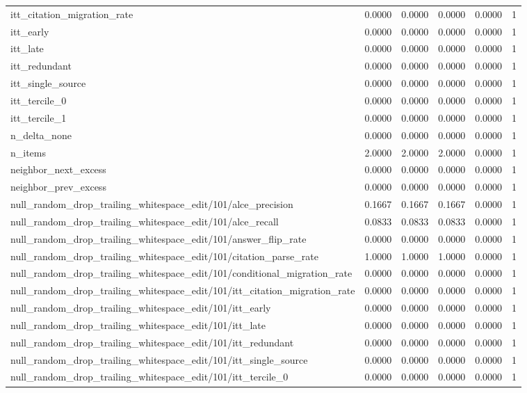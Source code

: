 \begin{table}[h]
\begin{tabular}{lrrrrr}
itt_citation_migration_rate & 0.0000 & 0.0000 & 0.0000 & 0.0000 & 1 \\
itt_early & 0.0000 & 0.0000 & 0.0000 & 0.0000 & 1 \\
itt_late & 0.0000 & 0.0000 & 0.0000 & 0.0000 & 1 \\
itt_redundant & 0.0000 & 0.0000 & 0.0000 & 0.0000 & 1 \\
itt_single_source & 0.0000 & 0.0000 & 0.0000 & 0.0000 & 1 \\
itt_tercile_0 & 0.0000 & 0.0000 & 0.0000 & 0.0000 & 1 \\
itt_tercile_1 & 0.0000 & 0.0000 & 0.0000 & 0.0000 & 1 \\
n_delta_none & 0.0000 & 0.0000 & 0.0000 & 0.0000 & 1 \\
n_items & 2.0000 & 2.0000 & 2.0000 & 0.0000 & 1 \\
neighbor_next_excess & 0.0000 & 0.0000 & 0.0000 & 0.0000 & 1 \\
neighbor_prev_excess & 0.0000 & 0.0000 & 0.0000 & 0.0000 & 1 \\
null_random_drop_trailing_whitespace_edit/101/alce_precision & 0.1667 & 0.1667 & 0.1667 & 0.0000 & 1 \\
null_random_drop_trailing_whitespace_edit/101/alce_recall & 0.0833 & 0.0833 & 0.0833 & 0.0000 & 1 \\
null_random_drop_trailing_whitespace_edit/101/answer_flip_rate & 0.0000 & 0.0000 & 0.0000 & 0.0000 & 1 \\
null_random_drop_trailing_whitespace_edit/101/citation_parse_rate & 1.0000 & 1.0000 & 1.0000 & 0.0000 & 1 \\
null_random_drop_trailing_whitespace_edit/101/conditional_migration_rate & 0.0000 & 0.0000 & 0.0000 & 0.0000 & 1 \\
null_random_drop_trailing_whitespace_edit/101/itt_citation_migration_rate & 0.0000 & 0.0000 & 0.0000 & 0.0000 & 1 \\
null_random_drop_trailing_whitespace_edit/101/itt_early & 0.0000 & 0.0000 & 0.0000 & 0.0000 & 1 \\
null_random_drop_trailing_whitespace_edit/101/itt_late & 0.0000 & 0.0000 & 0.0000 & 0.0000 & 1 \\
null_random_drop_trailing_whitespace_edit/101/itt_redundant & 0.0000 & 0.0000 & 0.0000 & 0.0000 & 1 \\
null_random_drop_trailing_whitespace_edit/101/itt_single_source & 0.0000 & 0.0000 & 0.0000 & 0.0000 & 1 \\
null_random_drop_trailing_whitespace_edit/101/itt_tercile_0 & 0.0000 & 0.0000 & 0.0000 & 0.0000 & 1 \\

\end{tabular}
\end{table}

